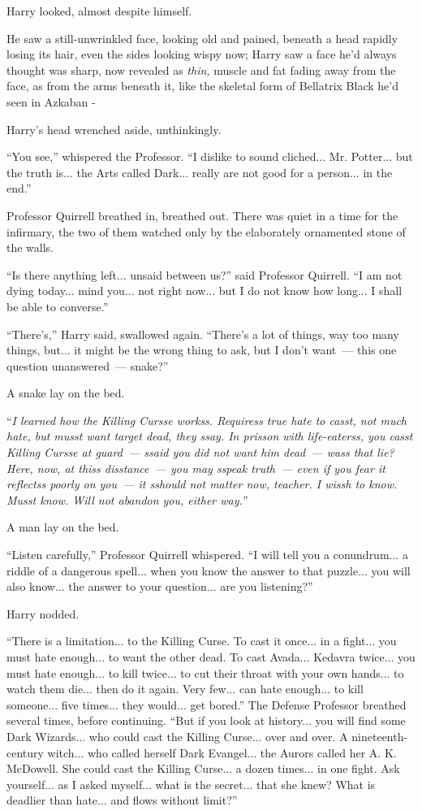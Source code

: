 Harry looked, almost despite himself.

He saw a still-unwrinkled face, looking old and pained, beneath a head rapidly losing its hair, even the sides looking wispy now; Harry saw a face he'd always thought was sharp, now revealed as \emph{thin,} muscle and fat fading away from the face, as from the arms beneath it, like the skeletal form of Bellatrix Black he'd seen in Azkaban -

Harry's head wrenched aside, unthinkingly.

``You see,'' whispered the Professor. ``I dislike to sound cliched... Mr. Potter... but the truth is... the Arts called Dark... really are not good for a person... in the end.''

Professor Quirrell breathed in, breathed out. There was quiet in a time for the infirmary, the two of them watched only by the elaborately ornamented stone of the walls.

``Is there anything left... unsaid between us?'' said Professor Quirrell. ``I am not dying today... mind you... not right now... but I do not know how long... I shall be able to converse.''

``There's,'' Harry said, swallowed again. ``There's a lot of things, way too many things, but... it might be the wrong thing to ask, but I don't want~--- this one question unanswered~--- snake?''

A snake lay on the bed.

``\emph{I learned how the Killing Cursse workss. Requiress true hate to casst, not much hate, but musst want target dead, they ssay. In prisson with life-eaterss, you casst Killing Cursse at guard~--- ssaid you did not want him dead~--- wass that lie? Here, now, at thiss disstance~--- you may sspeak truth~--- even if you fear it reflectss poorly on you~--- it sshould not matter now, teacher. I wissh to know. Musst know. Will not abandon you, either way.''}

A man lay on the bed.

``Listen carefully,'' Professor Quirrell whispered. ``I will tell you a conundrum... a riddle of a dangerous spell... when you know the answer to that puzzle... you will also know... the answer to your question... are you listening?''

Harry nodded.

``There is a limitation... to the Killing Curse. To cast it once... in a fight... you must hate enough... to want the other dead. To cast Avada... Kedavra twice... you must hate enough... to kill twice... to cut their throat with your own hands... to watch them die... then do it again. Very few... can hate enough... to kill someone... five times... they would... get bored.'' The Defense Professor breathed several times, before continuing. ``But if you look at history... you will find some Dark Wizards... who could cast the Killing Curse... over and over. A nineteenth-century witch... who called herself Dark Evangel... the Aurors called her A. K. McDowell. She could cast the Killing Curse... a dozen times... in one fight. Ask yourself... as I asked myself... what is the secret... that she knew? What is deadlier than hate... and flows without limit?''

